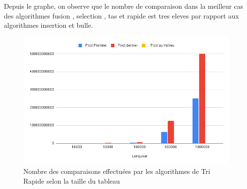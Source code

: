 \par
Depuis le graphe, on observe que le nombre de comparaison dans la meilleur cas des algorithmes fusion , selection , tas et rapide est tres eleves par rapport aux algorithmes insertion et bulle.  
\par
\begin{figure}[H]
    \centering
        \includegraphics[scale=0.7]{ressources/nb_triee.png}
        \caption{Nombre des comparaisons effectuées par les  algorithmes de Tri Rapide selon la taille du tableau}
    \label{fig:temps_exec_dico_theo}
\end{figure} 
\par
